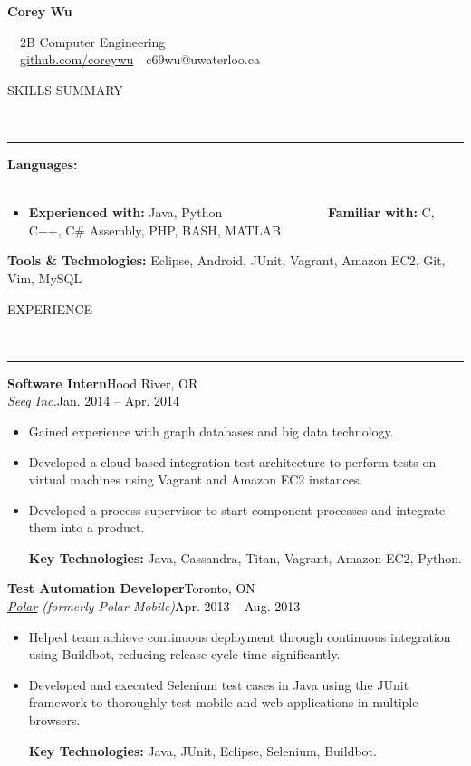 \documentclass[11pt, letterpaper, oneside]{article}
\makeatletter
\newcommand{\name}{Corey Wu}
\newcommand{\program}{2B Computer Engineering}
\newcommand{\github}{\href{https://github.com/coreywu}{github.com/coreywu}}
\newcommand{\email}{c69wu@uwaterloo.ca}
\newcommand{\HRule}[2]{\textcolor{#1}{\rule{\linewidth}{#2}}}
\newcommand{\sectiontitle}[1]{\begin{minipage}{\textwidth}\vspace{-7.5pt}\begin{flushleft}\hspace{-20.5pt}\vspace{-25pt}
\Large\MakeUppercase{#1}\end{flushleft}\end{minipage}\\\HRule{black}{0.15mm}\vspace{\baselineskip}}
\newenvironment{ressection}[1]{
  \sectiontitle{#1}}
  {\vspace{-\baselineskip}}
\newcommand{\resentryheader}[4]{
    \vspace{-6pt}
    \textbf{#1}\hspace{\stretch{1}}\textcolor{black}{#3}\\
    \textit{#2}\hspace{\stretch{1}}\textcolor{black}{#4}\\
}
\newcommand{\resitem}[1]{
    \vspace{2pt}
    \item \begin{flushleft} #1 \end{flushleft}
}
\newenvironment{resentry}[4]{
  \begin{minipage}{\textwidth}
  \vspace{-3pt}
    \resentryheader{#1}{#2}{#3}{#4}
        \vspace{-\baselineskip}
    \begin{itemize}[noitemsep,nolistsep]
}{
    \end{itemize}
        \vspace{\baselineskip}
        \end{minipage}
}
\makeatother
\begin{document}
\begin{center}
	{\Huge \textbf{\name}}

	\ \ {\Large{\program}} \\
	\ \ \github \ \textbullet \ \email \ \
\end{center}

\vspace{-20pt}

\begin{ressection}{Skills Summary}
\begin{resentry}{Languages:}{}{}{}{}
\vspace{-16pt}
\resitem{\textbf{Experienced with:} Java, Python \ \ \ \ \ \ \ \ \ \ \ \ \ \ \ \textbullet \ \textbf{Familiar with:} C, C++, C\# Assembly, PHP, BASH, MATLAB}
\vspace{-10pt}
\end{resentry}
\textbf{Tools \& Technologies:} Eclipse, Android, JUnit, Vagrant, Amazon EC2, Git, Vim, MySQL
\end{ressection}
\vspace{14pt}

\begin{ressection}{Experience}
  \begin{resentry}{Software Intern}{\href{http://www.seeq.com/}{Seeq Inc.}}{Hood River, OR}{Jan. 2014 -- Apr. 2014}
    \resitem{Gained experience with graph databases and big data technology.}
    \resitem{Developed a cloud-based integration test architecture to perform tests on virtual machines using Vagrant and Amazon EC2 instances.}
    \resitem{Developed a process supervisor to start component processes and integrate them into a product. }
    \vspace{4pt} \hspace{-15pt}
    \textbf{Key Technologies:} Java, Cassandra, Titan, Vagrant, Amazon EC2, Python.
  \end{resentry}
  \begin{resentry}{Test Automation Developer}{\href{http://polar.me/}{Polar} (formerly Polar Mobile)}{Toronto, ON}{Apr. 2013 -- Aug. 2013}
    \resitem{Helped team achieve continuous deployment through continuous integration using Buildbot, reducing release cycle time significantly.}
    \resitem{Developed and executed Selenium test cases in Java using the JUnit framework to thoroughly test mobile and web applications in multiple browsers.}
    \vspace{4pt} \hspace{-15pt}
    \textbf{Key Technologies:} Java, JUnit, Eclipse, Selenium, Buildbot.
  \end{resentry}
\end{ressection}
\end{document}
